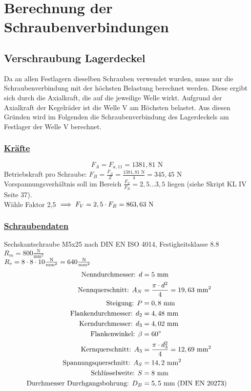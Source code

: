\newpage
\section{Berechnung der Schraubenverbindungen}
\subsection{Verschraubung Lagerdeckel}
Da an allen Festlagern dieselben Schrauben verwendet wurden, muss nur die Schraubenverbindung mit der höchsten Belastung berechnet werden. Diese ergibt sich durch die Axialkraft, die auf die jeweilige Welle wirkt. Aufgrund der Axialkraft der Kegelräder ist die Welle V am Höchsten belastet.
Aus diesen Gründen wird im Folgenden die Schraubenverbindung des Lagerdeckels am Festlager der Welle V berechnet.
\subsubsection{\underline{Kräfte}}
\[
	F_A = F_{a,11} = 1381,81 \text{ N}
\]
\flushleft
Betriebskraft pro Schraube: $F_B = \frac{F_A}{Z} = \frac{1381,81 \text{ N}}{4} = 345,45 \text{ N}$ \\
Vorspannungsverhältnis soll im Bereich $\frac{F_V}{F_B} = 2,5...3,5$ liegen (siehe Skript KL IV  Seite 37). \\
\vspace{.5cm}
Wähle Faktor 2,5 $\implies F_V = 2,5 \cdot F_B = 863,63 \text{ N}$

\newpage
\subsubsection{\underline{Schraubendaten}}
Sechskantschraube M5x25 nach DIN EN ISO 4014, Festigkeitsklasse 8.8\\
$R_m = 800 \frac{\text{N}}{\text{mm}^2}$\\
$R_e = 8\cdot8\cdot10\frac{\text{N}}{\text{mm}^2} = 640 \frac{\text{N}}{\text{mm}^2}$\\
\begin{align*}
\text{Nenndurchmesser: } d &= 5\text{ mm}\\
\text{Nennquerschnitt: } A_N &= \frac{\pi\cdot d^2}{4} = 19,63\text{ mm}^2\\
\text{Steigung: } P &= 0,8\text{ mm}\\
\text{Flankendurchmesser: } d_2 &= 4,48\text{ mm}\\
\text{Kerndurchmesser: } d_3 &= 4,02 \text{ mm}\\
\text{Flankenwinkel: } \beta &= 60^{\circ}\\
\text{Kernquerschnitt: } A_3 &= \frac{\pi\cdot d_3^2}{4} = 12,69\text{ mm}^2\\
\text{Spannungsquerschnitt: } A_S &= 14,2 \text{ mm}^2\\
\text{Schlüsselweite: } S &= 8 \text{ mm}\\
\text{Durchmesser Durchgangsbohrung: } D_B &= 5,5 \text{ mm} \text{ (DIN EN 20273)}
\end{align*}
\newpage

